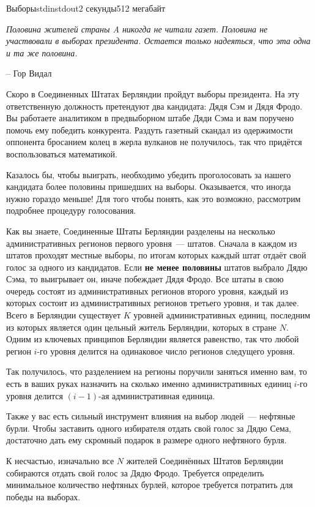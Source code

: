 \begin{problem}{Выборы}{stdin}{stdout}{2 секунды}{512 мегабайт}

\epigraph{\textit{Половина жителей страны A никогда не читали газет. Половина не участвовали в выборах президента. Остается только надеяться, что эта одна и та же половина.}}{-- Гор Видал}

Скоро в Соединенных Штатах Берляндии пройдут выборы президента. На эту ответственную должность претендуют два кандидата: Дядя Сэм и Дядя Фродо. Вы работаете аналитиком в предвыборном штабе Дяди Сэма и вам поручено помочь ему победить конкурента. Раздуть газетный скандал из одержимости оппонента бросанием колец в жерла вулканов не получилось, так что придётся воспользоваться математикой. 

Казалось бы, чтобы выиграть, необходимо убедить проголосовать за нашего кандидата более половины пришедших на выборы. Оказывается, что иногда нужно гораздо меньше! Для того чтобы понять, как это возможно, рассмотрим подробнее процедуру голосования.

Как вы знаете, Соединенные Штаты Берляндии разделены на несколько административных регионов первого уровня~--- штатов. Сначала в каждом из штатов проходят местные выборы, по итогам которых каждый штат отдаёт свой голос за одного из кандидатов. Если \textbf{не менее половины} штатов выбрало Дядю Сэма, то выигрывает он, иначе побеждает Дядя Фродо. Все штаты в свою очередь состоят из административных регионов второго уровня, каждый из которых состоит из административных регионов третьего уровня, и так далее. Всего в Берляндии существует $K$ уровней административных единиц, последним из которых является один цельный житель Берляндии, которых в стране $N$. Одним из ключевых принципов Берляндии является равенство, так что любой регион $i$-го уровня делится на одинаковое число регионов следущего уровня.

Так получилось, что разделением на регионы поручили заняться именно вам, то есть в ваших руках назначить на сколько именно административных единиц $i$-го уровня делится $(i - 1)$-ая административная единица.

Также у вас есть сильный инструмент влияния на выбор людей~--- нефтяные бурли. Чтобы заставить одного избирателя отдать свой голос за Дядю Сема, достаточно дать ему скромный подарок в размере одного нефтяного бурля. 

К несчастью, изначально все $N$ жителей Соединённых Штатов Берляндии собираются отдать свой голос за Дядю Фродо. Требуется определить минимальное количество нефтяных бурлей, которое требуется потратить для победы на выборах.


\end{problem}
